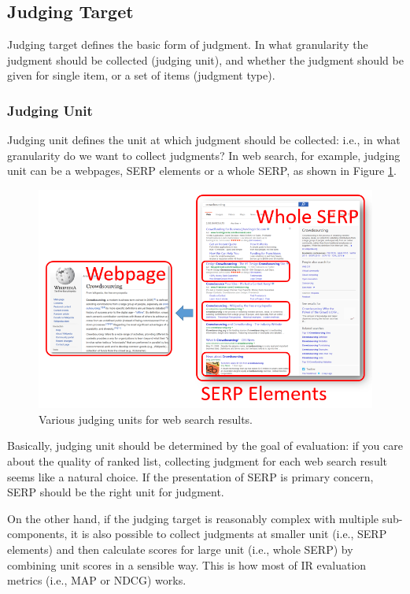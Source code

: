 \documentclass[openany]{now} %
\begin{document}
\subsection{Judging Target}
Judging target defines the basic form of judgment. In what granularity the judgment should be collected (judging unit), and whether the judgment should be given for single item, or a set of items (judgment type). 

\subsubsection{Judging Unit}
Judging unit defines the unit at which judgment should be collected: i.e., in what granularity do we want to collect judgments? In web search, for example, judging unit can be a webpages, SERP elements or a whole SERP, as shown in Figure \ref{fig:judging_units}. 

\begin{figure}
	\begin{center}
		\includegraphics[scale=0.5]{images/judging_units}
		\caption{Various judging units for web search results.} 
		\label{fig:judging_units}
	\end{center}
\end{figure}

Basically, judging unit should be determined by the goal of evaluation: if you care about the quality of ranked list, collecting judgment for each web search result seems like a natural choice. If the presentation of SERP is primary concern, SERP should be the right unit for judgment. 

On the other hand, if the judging target is reasonably complex with multiple sub-components, it is also possible to collect judgments at smaller unit (i.e., SERP elements) and then calculate scores for large unit (i.e., whole SERP) by combining unit scores in a sensible way. This is how most of IR evaluation metrics (i.e., MAP or NDCG) works.
\end{document}
